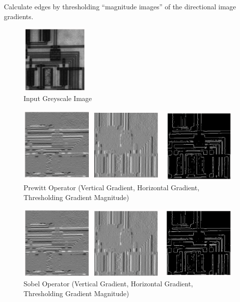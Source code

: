 \documentclass[a4paper,11pt]{article}
\begin{document}
\begin{tcolorbox}[colback=gray!10, colframe=black, title=\textbf{Edge Detection by Thresholding Magnitude Images}]
    Calculate edges by thresholding ``magnitude images'' of the directional image gradients.

\begin{figure}[H]
    \centering
    \includegraphics[width=0.3\textwidth]{images/thresholdingmagnitudeimages1.png}
    \caption{Input Greyscale Image}
\end{figure}

\begin{figure}[H]
    \centering
    \includegraphics[width=\textwidth]{images/thresholdingmagnitudeimages2.png}
    \caption{Prewitt Operator (Vertical Gradient, Horizontal Gradient, Thresholding Gradient Magnitude)}
\end{figure}
\begin{figure}[H]
    \centering
    \includegraphics[width=\textwidth]{images/thresholdingmagnitudeimages3.png}
    \caption{Sobel Operator (Vertical Gradient, Horizontal Gradient, Thresholding Gradient Magnitude)}
\end{figure}
\end{tcolorbox}
\end{document}
